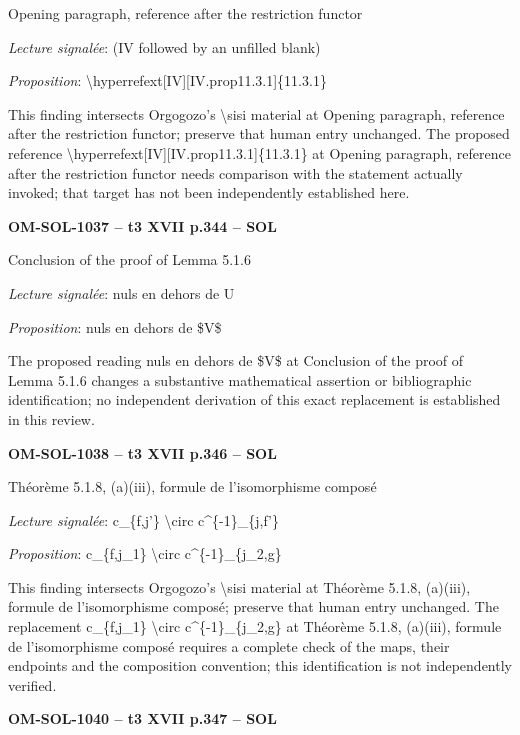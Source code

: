 Opening paragraph, reference after the restriction functor\par
\emph{Lecture signalée}: (IV followed by an unfilled blank)\par
\emph{Proposition}: \textbackslash{}hyperrefext[IV][IV.prop11.3.1]\{11.3.1\}\par
This finding intersects Orgogozo's \textbackslash{}sisi material at Opening paragraph, reference after the restriction functor; preserve that human entry unchanged. The proposed reference \textbackslash{}hyperrefext[IV][IV.prop11.3.1]\{11.3.1\} at Opening paragraph, reference after the restriction functor needs comparison with the statement actually invoked; that target has not been independently established here.\par
\par\noindent\textbf{OM-SOL-1037 -- t3 XVII p.344 -- SOL}\par
Conclusion of the proof of Lemma 5.1.6\par
\emph{Lecture signalée}: nuls en dehors de U\par
\emph{Proposition}: nuls en dehors de \$V\$\par
The proposed reading nuls en dehors de \$V\$ at Conclusion of the proof of Lemma 5.1.6 changes a substantive mathematical assertion or bibliographic identification; no independent derivation of this exact replacement is established in this review.\par
\par\noindent\textbf{OM-SOL-1038 -- t3 XVII p.346 -- SOL}\par
Théorème 5.1.8, (a)(iii), formule de l’isomorphisme composé\par
\emph{Lecture signalée}: c\_\{f,j'\} \textbackslash{}circ c\textasciicircum{}\{-1\}\_\{j,f'\}\par
\emph{Proposition}: c\_\{f,j\_1\} \textbackslash{}circ c\textasciicircum{}\{-1\}\_\{j\_2,g\}\par
This finding intersects Orgogozo's \textbackslash{}sisi material at Théorème 5.1.8, (a)(iii), formule de l’isomorphisme composé; preserve that human entry unchanged. The replacement c\_\{f,j\_1\} \textbackslash{}circ c\textasciicircum{}\{-1\}\_\{j\_2,g\} at Théorème 5.1.8, (a)(iii), formule de l’isomorphisme composé requires a complete check of the maps, their endpoints and the composition convention; this identification is not independently verified.\par
\par\noindent\textbf{OM-SOL-1040 -- t3 XVII p.347 -- SOL}\par
